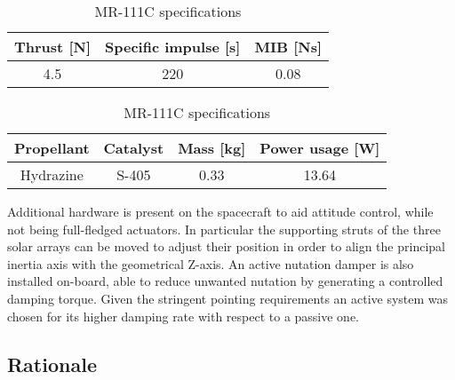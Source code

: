 \begin{table}[H]
    \renewcommand{\arraystretch}{1.3}
    \centering
    \begin{tabular}{|c|c|c|}
        \hline
        \textbf{Thrust [N]} & \textbf{Specific impulse [s]} & \textbf{MIB [Ns]} \\
        \hline
        \hline
        4.5 & 220 & 0.08 \\   
        \hline
    \end{tabular}

    \vspace{5mm}

    \begin{tabular}{|c|c|c|c|}
        \hline
        \textbf{Propellant} & \textbf{Catalyst} & \textbf{Mass [kg]} & \textbf{Power usage [W]}\\
        \hline
        \hline
        Hydrazine & S-405 & 0.33 & 13.64 \\ 
        \hline
    \end{tabular}
    \caption{MR-111C specifications}
    \label{table:RCS_specifications}
\end{table}

Additional hardware is present on the spacecraft to aid attitude control, while not being full-fledged actuators. In particular the supporting struts of the three solar arrays can be moved to adjust their position in order to align the principal inertia axis with the geometrical Z-axis. \cite{LL_early_cruise} An active nutation damper is also installed on-board, able to reduce unwanted nutation by generating a controlled damping torque. \cite{juno_sito} Given the stringent pointing requirements an active system was chosen for its higher damping rate with respect to a passive one.   

\subsection{Rationale}
\label{subsec:Rationale}

